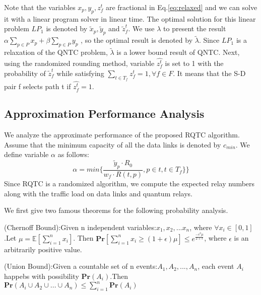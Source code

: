 Note that the variables $x_p, y_p, z_f^t$ are fractional in Eq.\ref{eq:relaxed} and we can solve it with a linear program solver in linear time. The optimal solution for this linear problem $LP_1$ is denoted by $\widetilde{x}_p,\widetilde{y}_p$ and $\widetilde{z}_f^t$. We use $\lambda$ to present the result $\alpha\sum_{p \in P}{x_p} + \beta\sum_{p \in P}{y_p}$ , so the optimal result is denoted by $\widetilde{\lambda}$. Since $LP_1$ is a relaxation of the QNTC problem, $\widetilde{\lambda}$ is a lower bound result of QNTC. Next, using the randomized rounding method, variable $\hat{z_f^t}$ is set to 1 with the probability of $\widetilde{z}_f^t$ while satisfying $\sum_{t \in T_f}{z_f^t} = 1, \forall f \in F$. It means that the S-D pair f selects path t if $\hat{z_f^t} = 1$.

\subsection{Approximation Performance Analysis}
We analyze the approximate performance of the proposed RQTC algorithm. Assume that the minimum capacity of all the data links is denoted by $c_{min}$. We define variable $\alpha$ as follows:
\begin{equation}\label{alpha}
  \alpha = min\{\frac{\widetilde{y}_p \cdot R_0}{w_f \cdot R(t,p)},p \in t,t \in T_f\}\}
\end{equation}
Since RQTC is a randomized algorithm, we compute the expected relay numbers along with the traffic load on data links and quantum relays.


We first give two famous theorems for the following probability analysis.
\begin{lemma}\label{chernoff}
(Chernoff Bound):Given n independent variables:$x_1,x_2,...x_n$, where $\forall x_i \in [0,1]$.Let $\mu = \mathbb{E}[\sum_{i=1}^{n}x_i]$. Then $\textbf{Pr}[\sum_{i=1}^{n}x_i \ge (1+\epsilon)\mu] \le e^{\frac{-\epsilon^2\mu}{2+\epsilon}}$, where $\epsilon$ is an arbitrarily positive value.
\end{lemma}

\begin{lemma}\label{unionbound}
(Union Bound):Given a countable set of n events:$A_1,A_2,...,A_n$, each event $A_i$ happebs with possibility $\textbf{Pr}(A_i)$.Then $\textbf{Pr}(A_i \cup A_2 \cup... \cup A_n) \le \sum_{i=1}^{n}\textbf{Pr}(A_i)$
\end{lemma}


